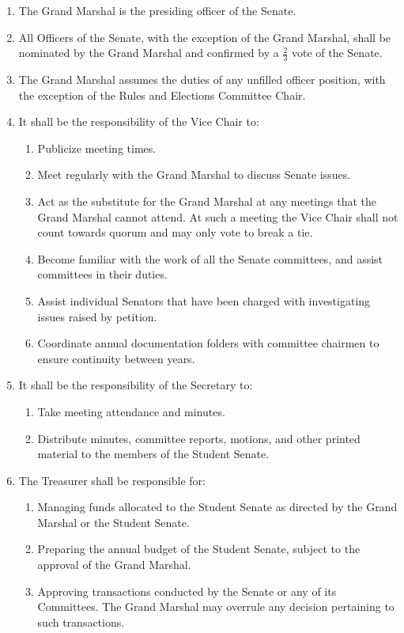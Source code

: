 \documentclass{bylaws}
\begin{document}
\begin{enumerate}
\item The Grand Marshal is the presiding officer of the Senate.
\item All Officers of the Senate, with the exception of the Grand Marshal, shall be nominated by the Grand Marshal and confirmed
by a $\frac{2}{3}$ vote of the Senate.
\item The Grand Marshal assumes the duties of any unfilled officer position, with the exception of the Rules and Elections
Committee Chair.
\item It shall be the responsibility of the Vice Chair to:
\begin{enumerate}
\item Publicize meeting times.
\item Meet regularly with the Grand Marshal to discuss Senate issues.
\item Act as the substitute for the Grand Marshal at any meetings that the Grand Marshal cannot attend. At such a meeting the
Vice Chair shall not count towards quorum and may only vote to break a tie.
\item Become familiar with the work of all the Senate committees, and assist committees in their duties.
\item Assist individual Senators that have been charged with investigating issues raised by petition.
\item Coordinate annual documentation folders with committee chairmen to ensure continuity between years.
\end{enumerate}

\item It shall be the responsibility of the Secretary to:
\begin{enumerate}
\item Take meeting attendance and minutes.
\item Distribute minutes, committee reports, motions, and other printed material to the members of the Student Senate.
\end{enumerate}

\item The Treasurer shall be responsible for:
\begin{enumerate}
\item Managing funds allocated to the Student Senate as directed by the Grand Marshal or the Student Senate.
\item Preparing the annual budget of the Student Senate, subject to the approval of the Grand Marshal.
\item Approving transactions conducted by the Senate or any of its Committees. The Grand Marshal may overrule any decision
pertaining to such transactions.
\end{enumerate}


\end{enumerate}
\end{document}
